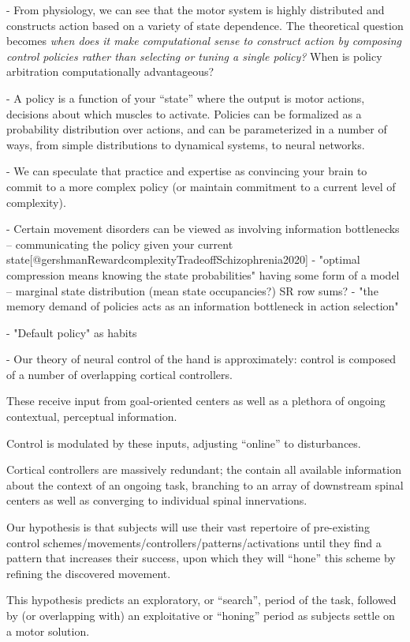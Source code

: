 \documentclass[../main.tex]{subfiles}
\begin{document}
- From physiology, we can see that the motor system is highly distributed and constructs action based on a variety of state dependence. The theoretical question becomes \emph{when does it make computational sense to construct action by composing control policies rather than selecting or tuning a single policy?} When is policy arbitration computationally advantageous?

- A policy is a function of your ``state'' where the output is motor actions, decisions about which muscles to activate. Policies can be formalized as a probability distribution over actions, and can be parameterized in a number of ways, from simple distributions to dynamical systems, to neural networks.

- We can speculate that practice and expertise as convincing your brain to commit to a more complex policy (or maintain commitment to a current level of complexity).

- Certain movement disorders can be viewed as involving information bottlenecks -- communicating the policy given your current state[@gershmanRewardcomplexityTradeoffSchizophrenia2020] 
- "optimal compression means knowing the state probabilities" having some form of a model -- marginal state distribution (mean state occupancies?) SR row sums?
- "the memory demand of policies acts as an information bottleneck in action selection"

- "Default policy" as habits \cite{pirayLinearReinforcementLearning2019}

- Our theory of neural control of the hand is approximately: control is composed of a number of overlapping cortical controllers. 

These receive input from goal-oriented centers as well as a plethora of ongoing contextual, perceptual information. 

Control is modulated by these inputs, adjusting “online” to disturbances. 

Cortical controllers are massively redundant; the contain all available information about the context of an ongoing task, branching to an array of downstream spinal centers as well as converging to individual spinal innervations. 

Our hypothesis is that subjects will use their vast repertoire of pre-existing control schemes/movements/controllers/patterns/activations until they find a pattern that increases their success, upon which they will “hone” this scheme by refining the discovered movement. 

This hypothesis predicts an exploratory, or “search”, period of the task, followed by (or overlapping with) an exploitative or “honing” period as subjects settle on a motor solution. 
\end{document}
